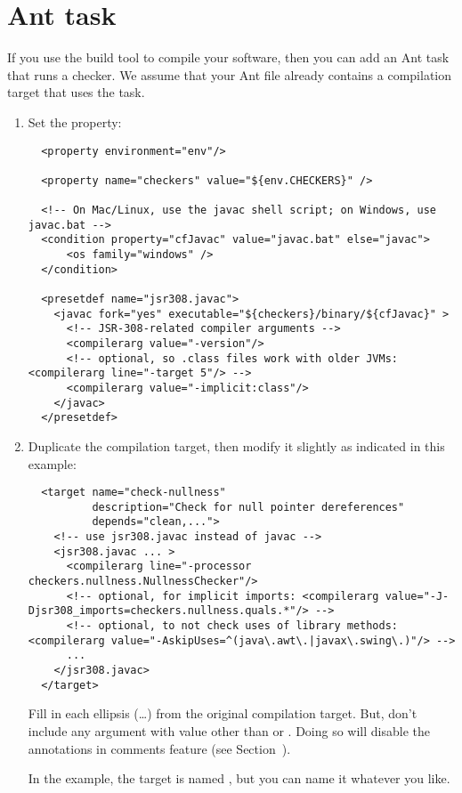 \section{Ant task\label{ant-task}}

If you use the  build tool to compile
your software, then you can add an Ant task that runs a checker.  We assume
that your Ant file already contains a compilation target that uses the
 task.

\begin{enumerate}
\item
Set the  property:

\begin{smaller}
\begin{Verbatim}
  <property environment="env"/>

  <property name="checkers" value="${env.CHECKERS}" />
  
  <!-- On Mac/Linux, use the javac shell script; on Windows, use javac.bat -->
  <condition property="cfJavac" value="javac.bat" else="javac">
      <os family="windows" />
  </condition>

  <presetdef name="jsr308.javac">
    <javac fork="yes" executable="${checkers}/binary/${cfJavac}" >
      <!-- JSR-308-related compiler arguments -->
      <compilerarg value="-version"/>
      <!-- optional, so .class files work with older JVMs: <compilerarg line="-target 5"/> -->
      <compilerarg value="-implicit:class"/>
    </javac>
  </presetdef>
\end{Verbatim}
\end{smaller}

\item Duplicate the compilation target, then modify it slightly as
indicated in this example:

\begin{smaller}
\begin{Verbatim}
  <target name="check-nullness"
          description="Check for null pointer dereferences"
          depends="clean,...">
    <!-- use jsr308.javac instead of javac -->
    <jsr308.javac ... >
      <compilerarg line="-processor checkers.nullness.NullnessChecker"/>
      <!-- optional, for implicit imports: <compilerarg value="-J-Djsr308_imports=checkers.nullness.quals.*"/> -->
      <!-- optional, to not check uses of library methods: <compilerarg value="-AskipUses=^(java\.awt\.|javax\.swing\.)"/> -->
      ...
    </jsr308.javac>
  </target>
\end{Verbatim}
\end{smaller}

Fill in each ellipsis (\ldots) from the original compilation target.  But,
don't include any  argument with value other than 
or .  Doing so will disable the annotations in
comments feature (see Section~).

In the example, the target is named , but you can
name it whatever you like.
\end{enumerate}

